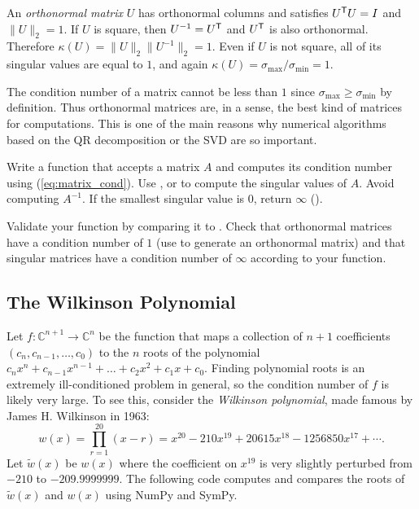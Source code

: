 \begin{info} %
An \emph{orthonormal matrix} $U$ has orthonormal columns and satisfies $U^{\mathsf T} U = I$ and $\|U\|_2 = 1$.
If $U$ is square, then $U^{-1} = U^{\mathsf T}$ and $U^{\mathsf T}$ is also orthonormal.
Therefore $\kappa(U) = \|U\|_2\|U^{-1}\|_2 = 1$.
Even if $U$ is not square, all of its singular values are equal to $1$, and again $\kappa(U) = \sigma_{\max} / \sigma_{\min} = 1$.

The condition number of a matrix cannot be less than $1$ since $\sigma_{\max} \ge \sigma_{\min}$ by definition.
Thus orthonormal matrices are, in a sense, the best kind of matrices for computations.
This is one of the main reasons why numerical algorithms based on the QR decomposition or the SVD are so important.
\end{info}

\begin{problem} %
Write a function that accepts a matrix $A$ and computes its condition number using (\ref{eq:matrix_cond}).
Use , or  to compute the singular values of $A$.
Avoid computing $A^{-1}$.
If the smallest singular value is $0$, return $\infty$ ().

Validate your function by comparing it to .
Check that orthonormal matrices have a condition number of $1$ (use  to generate an orthonormal matrix) and that singular matrices have a condition number of $\infty$ according to your function.
\end{problem}


\subsection*{The Wilkinson Polynomial} %

Let $f:\mathbb{C}^{n+1} \rightarrow \mathbb{C}^n$ be the function that maps a collection of $n+1$ coefficients $(c_n, c_{n-1}, \ldots, c_0)$ to the $n$ roots of the polynomial $c_nx^n+c_{n-1}x^{n-1}+\ldots+c_2x^2+c_1x+c_0$.
Finding polynomial roots is an extremely ill-conditioned problem in general, so the condition number of $f$ is likely very large.
To see this, consider the \emph{Wilkinson polynomial}, made famous by James H. Wilkinson in 1963:
\[
w(x) = \prod_{r=1}^{20}(x-r) = x^{20} - 210x^{19} + 20615x^{18} - 1256850x^{17} + \cdots.
\]
Let $\tilde{w}(x)$ be $w(x)$ where the coefficient on $x^{19}$ is very slightly perturbed from $-210$ to $-209.9999999$.
The following code computes and compares the roots of $\tilde{w}(x)$ and $w(x)$ using NumPy and SymPy.

